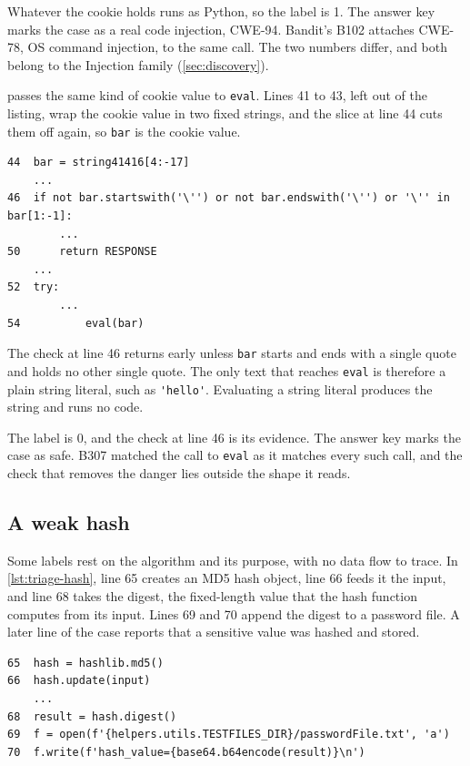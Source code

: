 Whatever the cookie holds runs as Python, so the label is 1. The answer key marks the case as a real
code injection, CWE-94. Bandit's B102 attaches CWE-78, OS command injection, to the same call. The
two numbers differ, and both belong to the Injection family (\cref{sec:discovery}).

 passes the same kind of cookie value to \texttt{eval}. Lines 41 to 43,
left out of the listing, wrap the cookie value in two fixed strings, and the slice at line 44 cuts
them off again, so \texttt{bar} is the cookie value.

\noindent\begin{minipage}{\linewidth}
\begin{lstlisting}[breakatwhitespace=true, basicstyle=\ttfamily\footnotesize, caption={A false positive on eval: BenchmarkTest00073, lines 44 to 54.}, label=lst:triage-code-false]
44  bar = string41416[4:-17]
    ...
46  if not bar.startswith('\'') or not bar.endswith('\'') or '\'' in bar[1:-1]:
        ...
50      return RESPONSE
    ...
52  try:
        ...
54          eval(bar)
\end{lstlisting}
\end{minipage}

The check at line 46 returns early unless \texttt{bar} starts and ends with a single quote and holds
no other single quote. The only text that reaches \texttt{eval} is therefore a plain string literal,
such as \lstinline|'hello'|. Evaluating a string literal produces the string and runs no code.

The label is 0, and the check at line 46 is its evidence. The answer key marks the case as safe. B307
matched the call to \texttt{eval} as it matches every such call, and the check that removes the
danger lies outside the shape it reads.

\subsection{A weak hash}
\label{sec:triage-hash}

Some labels rest on the algorithm and its purpose, with no data flow to trace. In
\cref{lst:triage-hash}, line 65 creates an MD5 hash object, line 66 feeds it the input, and line 68
takes the digest, the fixed-length value that the hash function computes from its input. Lines 69
and 70 append the digest to a password file. A later line of the case reports that a sensitive value
was hashed and stored.

\noindent\begin{minipage}{\linewidth}
\begin{lstlisting}[breakatwhitespace=true, basicstyle=\ttfamily\footnotesize, caption={A weak hash for a sensitive value: BenchmarkTest00057, lines 65 to 70.}, label=lst:triage-hash]
65  hash = hashlib.md5()
66  hash.update(input)
    ...
68  result = hash.digest()
69  f = open(f'{helpers.utils.TESTFILES_DIR}/passwordFile.txt', 'a')
70  f.write(f'hash_value={base64.b64encode(result)}\n')
\end{lstlisting}
\end{minipage}

